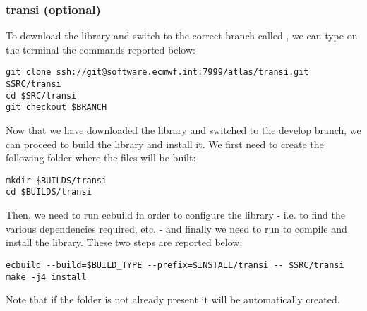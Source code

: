 \subsubsection{transi (optional)}
To download the library and switch to the correct branch called 
, we can type on the terminal the commands reported 
below:
%
\begin{lstlisting}[style=BashStyle]
git clone ssh://git@software.ecmwf.int:7999/atlas/transi.git $SRC/transi
cd $SRC/transi
git checkout $BRANCH
\end{lstlisting}
%
Now that we have downloaded the library and switched 
to the develop branch, we can proceed to build the 
library and install it. We first need to create the 
following folder where the files will be built:
%
\begin{lstlisting}[style=BashStyle]
mkdir $BUILDS/transi
cd $BUILDS/transi
\end{lstlisting}
%
Then, we need to run ecbuild in order to configure the 
library - i.e. to find the various dependencies required, 
etc. - and finally we need to run  
to compile and install the library. These two steps are 
reported below:
%
\begin{lstlisting}[style=BashStyle]
ecbuild --build=$BUILD_TYPE --prefix=$INSTALL/transi -- $SRC/transi
make -j4 install
\end{lstlisting}
%
Note that if the folder  is not already 
present it will be automatically created.



